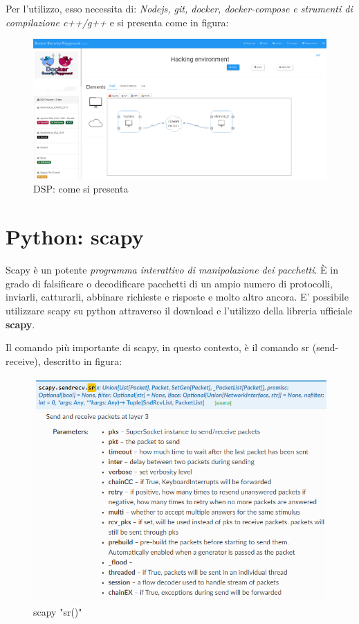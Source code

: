 Per l'utilizzo, esso necessita di: \textit{Nodejs, git, docker, docker-compose e strumenti di compilazione c++/g++} e si presenta come in figura: 
\begin{figure}[h]
\includegraphics[scale=0.18]{UNINA_MSc_Thesis_Project/img/DSP_comesipresenta.png}
\centering
\caption{DSP: come si presenta}
\end{figure}

\section{Python: scapy}
Scapy è un potente \textit{programma interattivo di manipolazione dei pacchetti}. È in grado di falsificare o decodificare pacchetti di un ampio numero di protocolli, inviarli, catturarli, abbinare richieste e risposte e molto altro ancora. E' possibile utilizzare scapy su python attraverso il download e l'utilizzo della libreria ufficiale \textbf{scapy}.

Il comando più importante di scapy, in questo contesto, è il comando sr (send-receive), descritto in figura:
\begin{figure}[h]
\includegraphics[scale=0.60]{UNINA_MSc_Thesis_Project/img/scapy_sr.png}
\centering
\caption{scapy "sr()"}
\end{figure}

